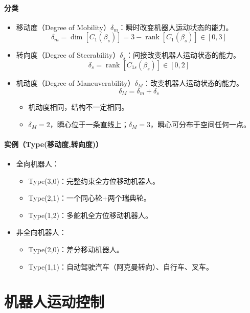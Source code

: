 \documentclass[
12pt, %
a4paper, 
oneside, %
headinclude,footinclude, %
]{scrartcl}
\begin{document}
\paragraph{分类}
\begin{itemize}
\item 移动度（Degree of Mobility）$ \delta_m $：瞬时改变机器人运动状态的能力。
$$ \delta_m = \dim[C_1(\beta_s)] = 3 - \operatorname{rank}[C_1(\beta_s)] \in [0,3] $$
\item 转向度（Degree of Steerability）$ \delta_s $：间接改变机器人运动状态的能力。
$$ \delta_s = \operatorname{rank}[C_{1s}(\beta_s)] \in [0,2] $$
\item 机动度（Degree of Maneuverability）$ \delta_M $：改变机器人运动状态的能力。
$$ \delta_M = \delta_m + \delta_s $$
\begin{itemize}
\item 机动度相同，结构不一定相同。
\item $ \delta_M = 2 $，瞬心位于一条直线上；$ \delta_M = 3 $，瞬心可分布于空间任何一点。
\end{itemize}
\end{itemize}
\paragraph{实例（Type(移动度,转向度)）}
\begin{itemize}
\item 全向机器人：
\begin{itemize}
\item Type(3,0)：完整约束全方位移动机器人。
\item Type(2,1)：一个同心轮+两个瑞典轮。
\item Type(1,2)：多舵机全方位移动机器人。
\end{itemize}
\item 非全向机器人：
\begin{itemize}
\item Type(2,0)：差分移动机器人。
\item Type(1,1)：自动驾驶汽车（阿克曼转向）、自行车、叉车。
\end{itemize}
\end{itemize}
\section{机器人运动控制}
\end{document}
